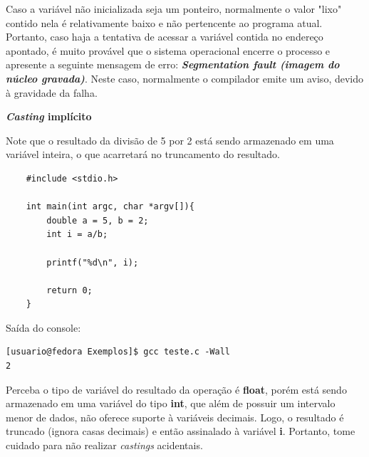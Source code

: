 \documentclass[12pt]{article}
\newcommand\tab[1][1cm]{\hspace*{#1}}
\begin{document}
\hspace{0.25cm}
\begin{tcolorbox}[colback=red!5!white,colframe=red!75!black,title=Cuidado!]
  \par\tab Caso a variável não inicializada seja um ponteiro, normalmente o valor "lixo" contido nela é relativamente baixo e não pertencente ao programa atual. Portanto, caso haja a tentativa de acessar a variável contida no endereço apontado, é muito provável que o sistema operacional encerre o processo e apresente a seguinte mensagem de erro: \textbf{\textit{Segmentation fault (imagem do núcleo gravada)}}. Neste caso, normalmente o compilador emite um aviso, devido à gravidade da falha.
\end{tcolorbox}

\hspace{2cm}
\par\tab\textbf{\textit{Casting} implícito}

\par\tab Note que o resultado da divisão de 5 por 2 está sendo armazenado em uma variável inteira, o que acarretará no truncamento do resultado.

\hspace{0.25cm}
\begin{lstlisting}
    #include <stdio.h>
    
    int main(int argc, char *argv[]){
        double a = 5, b = 2;
        int i = a/b;
        
        printf("%d\n", i);
        
        return 0;
    }
\end{lstlisting}

\par\tab Saída do console:

\hspace{0.25cm}
\begin{tcolorbox}[colback=black!5!white,colframe=black!75!white,title=Console: usuario@fedora:\~/Exemplos]
    \begin{verbatim}
[usuario@fedora Exemplos]$ gcc teste.c -Wall
2
    \end{verbatim}
\end{tcolorbox}

\par\tab Perceba o tipo de variável do resultado da operação é \textbf{float}, porém está sendo armazenado em uma variável do tipo \textbf{int}, que além de possuir um intervalo menor de dados, não oferece suporte à variáveis decimais. Logo, o resultado é truncado (ignora casas decimais) e então assinalado à variável \textbf{i}. Portanto, tome cuidado para não realizar \textit{castings} acidentais.
\end{document}
